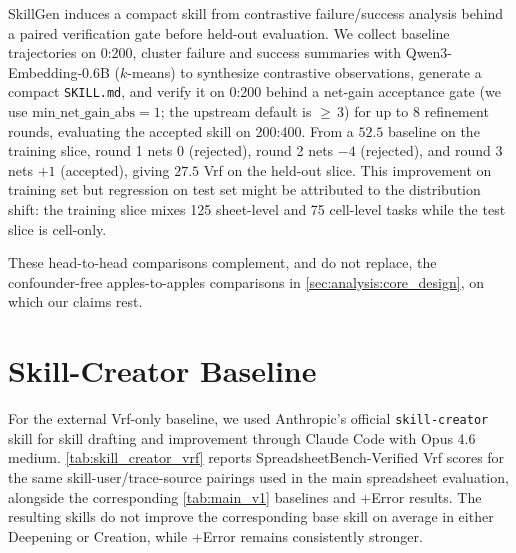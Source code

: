 SkillGen induces a compact skill from contrastive failure/success analysis behind a paired verification gate before held-out evaluation.
We collect baseline trajectories on 0:200, cluster failure and success summaries with Qwen3-Embedding-0.6B ($k$-means) to synthesize contrastive observations, generate a compact \texttt{SKILL.md}, and verify it on 0:200 behind a net-gain acceptance gate (we use $\mathrm{min\_net\_gain\_abs}{=}1$; the upstream default is ${\ge}\,3$) for up to 8 refinement rounds, evaluating the accepted skill on 200:400.
From a $52.5$ baseline on the training slice, round 1 nets $0$ (rejected), round 2 nets $-4$ (rejected), and round 3 nets $+1$ (accepted), giving $27.5$ Vrf on the held-out slice. This improvement on training set but regression on test set might be attributed to the distribution shift: the training slice mixes 125 sheet-level and 75 cell-level tasks while the test slice is cell-only.

These head-to-head comparisons complement, and do not replace, the confounder-free apples-to-apples comparisons in \cref{sec:analysis:core_design}, on which our claims rest.

\section{Skill-Creator Baseline}
\label{app:skill_creator_baseline}

For the external Vrf-only baseline, we used Anthropic's official \texttt{skill-creator} skill for skill drafting and improvement \citep{anthropic2026skillcreatorrepo} through Claude Code with Opus 4.6 medium.
\cref{tab:skill_creator_vrf} reports SpreadsheetBench-Verified Vrf scores for the same skill-user/trace-source pairings used in the main spreadsheet evaluation, alongside the corresponding \cref{tab:main_v1} baselines and \systemname{} +Error results.
The resulting skills do not improve the corresponding base skill on average in either Deepening or Creation, while \systemname{} +Error remains consistently stronger.

